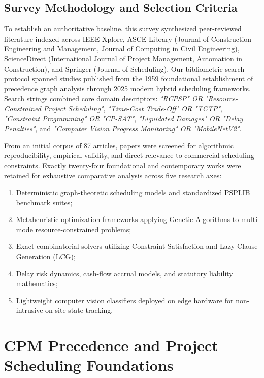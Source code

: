\documentclass[conference]{IEEEtran}
\begin{document}
\subsection{Survey Methodology and Selection Criteria}
To establish an authoritative baseline, this survey synthesized peer-reviewed literature indexed across IEEE Xplore, ASCE Library (Journal of Construction Engineering and Management, Journal of Computing in Civil Engineering), ScienceDirect (International Journal of Project Management, Automation in Construction), and Springer (Journal of Scheduling). Our bibliometric search protocol spanned studies published from the 1959 foundational establishment of precedence graph analysis through 2025 modern hybrid scheduling frameworks. Search strings combined core domain descriptors: \emph{"RCPSP" OR "Resource-Constrained Project Scheduling"}, \emph{"Time-Cost Trade-Off" OR "TCTP"}, \emph{"Constraint Programming" OR "CP-SAT"}, \emph{"Liquidated Damages" OR "Delay Penalties"}, and \emph{"Computer Vision Progress Monitoring" OR "MobileNetV2"}. 

From an initial corpus of 87 articles, papers were screened for algorithmic reproducibility, empirical validity, and direct relevance to commercial scheduling constraints. Exactly twenty-four foundational and contemporary works were retained for exhaustive comparative analysis across five research axes:
\begin{enumerate}
    \item Deterministic graph-theoretic scheduling models and standardized PSPLIB benchmark suites;
    \item Metaheuristic optimization frameworks applying Genetic Algorithms to multi-mode resource-constrained problems;
    \item Exact combinatorial solvers utilizing Constraint Satisfaction and Lazy Clause Generation (LCG);
    \item Delay risk dynamics, cash-flow accrual models, and statutory liability mathematics;
    \item Lightweight computer vision classifiers deployed on edge hardware for non-intrusive on-site state tracking.
\end{enumerate}

\section{CPM Precedence and Project Scheduling Foundations}
\end{document}
